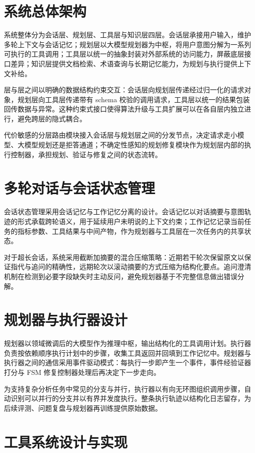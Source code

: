 \section{系统总体架构}

系统整体分为会话层、规划层、工具层与知识层四层。会话层承接用户输入，维护多轮上下文与会话记忆；规划层以大模型规划器为中枢，将用户意图分解为一系列可执行的工具调用；工具层以统一的抽象封装对外部系统的访问能力，屏蔽底层接口差异；知识层提供文档检索、术语查询与长期记忆能力，为规划与执行提供上下文补给。

层与层之间以明确的数据结构约束交互：会话层向规划层传递经过归一化的请求对象，规划层向工具层传递带有 schema 校验的调用请求，工具层以统一的结果包装回传数据与异常。这种约束式接口使得算法升级与工具扩展可以在各自层内独立进行，避免跨层的隐式耦合。

代价敏感的分层路由模块接入会话层与规划层之间的分发节点，决定请求走小模型、大模型规划还是拒答通道；不确定性感知的规划修复模块作为规划层内部的执行控制器，承担规划、验证与修复之间的状态流转。

\section{多轮对话与会话状态管理}

会话状态管理采用会话记忆与工作记忆分离的设计。会话记忆以对话摘要与意图轨迹的形式承载跨轮语义，用于延续用户未明说的上下文约束；工作记忆记录当前任务的指标参数、工具结果与中间产物，作为规划器与工具层在一次任务内的共享状态。

对于超长会话，系统采用截断加摘要的混合压缩策略：近期若干轮次保留原文以保证指代与追问的精确性，远期轮次以滚动摘要的方式压缩为结构化要点。追问澄清机制在检测到必要字段缺失时主动反问，避免规划器基于不完整信息做出错误分解。

\section{规划器与执行器设计}

规划器以领域微调后的大模型作为推理中枢，输出结构化的工具调用计划。执行器负责按依赖顺序执行计划中的步骤，收集工具返回并回填到工作记忆中。规划器与执行器之间的通信采用事件驱动模式：每执行一步即产生一个事件，事件经验证器打分与 FSM 修复控制器处理后再决定下一步走向。

为支持复杂分析任务中常见的分支与并行，执行器以有向无环图组织调用步骤，自动识别可以并行的分支并以有界并发度执行。整条执行轨迹以结构化日志留存，为后续评测、问题复盘与规划器再训练提供原始数据。

\section{工具系统设计与实现}

